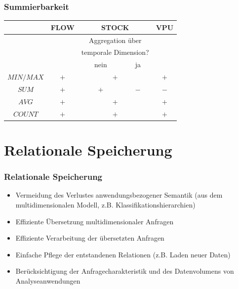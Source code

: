         \begin{frame}

        \frametitle{Summierbarkeit}

        \begin{center}

                \begin{tabular}{|c|c|c|c|c|}
                \hline &	FLOW	& \multicolumn{2}{c|}{STOCK} & 	VPU \\
                \hline  && \multicolumn{2}{c|}{Aggregation	über} &\\
                && \multicolumn{2}{c|}{temporale Dimension?}	& \\
                  \cline{3-4}		&&	nein&	ja&	\\
                \hline	\hline $MIN/MAX$	&$+$	&\multicolumn{2}{c|}{$+$}		&$+$\\
                \hline	$SUM$	&$+$	&$+$&	$-$&	$-$\\
                \hline	$AVG$	&$+$&\multicolumn{2}{c|}{$+$}	&	$+$\\
                \hline	$COUNT$	&$+$	&\multicolumn{2}{c|}{$+$}	&$	+$\\
                \hline
                \end{tabular}
        \end{center}

        \end{frame}


\section{Relationale Speicherung}


        \begin{frame}

            \frametitle{Relationale Speicherung}
            \begin{itemize}
            \item Vermeidung des Verlustes anwendungsbezogener Semantik (aus dem
              multidimensionalen Modell, z.B. Klassifikationshierarchien)
            \item Effiziente Übersetzung multidimensionaler Anfragen
            \item Effiziente Verarbeitung der übersetzten Anfragen
            \item Einfache Pflege der entstandenen Relationen (z.B. Laden neuer
              Daten)
            \item Berücksichtigung der Anfragecharakteristik und des Datenvolumens
              von Analyseanwendungen
            \end{itemize}
        
            \end{frame}
        
